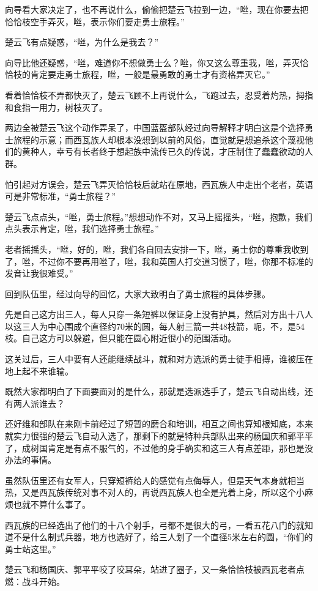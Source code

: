 向导看大家决定了，也不再说什么，偷偷把楚云飞拉到一边，“咝，现在你要去把恰恰枝空手弄灭，咝，表示你们要走勇士旅程。”

楚云飞有点疑惑，“咝，为什么是我去？”

向导比他还疑惑，“咝，难道你不想做勇士么？咝，你又这么尊重我，咝，弄灭恰恰枝的肯定要走勇士旅程，咝，一般是最勇敢的勇士才有资格弄灭它。”

看着恰恰枝不弄都快灭了，楚云飞顾不上再说什么，飞跑过去，忍受着灼热，拇指和食指一用力，树枝灭了。

两边全被楚云飞这个动作弄呆了，中国蓝盔部队经过向导解释才明白这是个选择勇士旅程的示意；而西瓦族人却根本没想到以前的风俗，直觉就是想追杀这个蔑视他们的黄种人，幸亏有长者终于想起族中流传已久的传说，才压制住了蠢蠢欲动的人群。

怕引起对方误会，楚云飞弄灭恰恰枝后就站在原地，西瓦族人中走出个老者，英语可是非常标准，“勇士旅程？”

楚云飞点点头，“咝，勇士旅程。”想想动作不对，又马上摇摇头，“咝，抱歉，我们点头表示肯定，咝，我们选择勇士旅程。”

老者摇摇头，“咝，好的，咝，我们各自回去安排一下，咝，勇士你的尊重我收到了，咝，不过你不要再用咝了，咝，我和英国人打交道习惯了，咝，你那不标准的发音让我很难受。”

回到队伍里，经过向导的回忆，大家大致明白了勇士旅程的具体步骤。

先是自己这方出三人，每人只穿一条短裤以保证身上没有护具，然后对方出十八人以这三人为中心围成个直径约70米的圆，每人射三箭一共48枝箭，呃，不，是54枝。自己这方可以躲避，但只能在圆心附近很小的范围活动。

这关过后，三人中要有人还能继续战斗，就和对方选派的勇士徒手相搏，谁被压在地上起不来谁输。

既然大家都明白了下面要面对的是什么，那就是选派选手了，楚云飞自动出线，还有两人派谁去？

还好维和部队在来刚卡前经过了短暂的磨合和培训，相互之间也算知根知底，本来就实力很强的楚云飞自动入选了，那剩下的就是特种兵部队出来的杨国庆和郭平平了，成树国肯定是有点不服气的，不过他的身手确实和这三人有点差距，那也是没办法的事情。

虽然队伍里还有女军人，只穿短裤给人的感觉有点侮辱人，但是天气本身就相当热，又是西瓦族传统对事不对人的，再说西瓦族人也全是光着上身，所以这个小麻烦也就不算什么事了。

西瓦族的已经选出了他们的十八个射手，弓都不是很大的弓，一看五花八门的就知道不是什么制式兵器，地方也选好了，给三人划了一个直径5米左右的圆，“你们的勇士站这里。”

楚云飞和杨国庆、郭平平咬了咬耳朵，站进了圈子，又一条恰恰枝被西瓦老者点燃：战斗开始。

